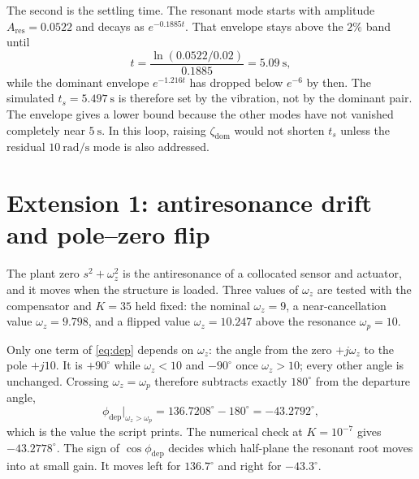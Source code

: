 \documentclass[12pt,a4paper]{article}
\begin{document}
The second is the settling time.
The resonant mode starts with amplitude \(A_{\mathrm{res}}=0.0522\) and decays as \(e^{-0.1885t}\).
That envelope stays above the \(2\%\) band until
\begin{equation}
  t=\frac{\ln(0.0522/0.02)}{0.1885}=5.09~\mathrm{s},
  \label{eq:tsenv}
\end{equation}
while the dominant envelope \(e^{-1.216t}\) has dropped below \(e^{-6}\) by then.
The simulated \(t_s=5.497~\mathrm{s}\) is therefore set by the vibration, not by the dominant pair. The envelope gives a lower bound because the other modes have not vanished completely near \(5~\mathrm{s}\).
In this loop, raising \(\zeta_{\mathrm{dom}}\) would not shorten \(t_s\) unless the residual \(10~\mathrm{rad/s}\) mode is also addressed.

\section{Extension 1: antiresonance drift and pole--zero flip}

The plant zero \(s^2+\omega_z^2\) is the antiresonance of a collocated sensor and actuator, and it moves when the structure is loaded.
Three values of \(\omega_z\) are tested with the compensator and \(K=35\) held fixed: the nominal \(\omega_z=9\), a near-cancellation value \(\omega_z=9.798\), and a flipped value \(\omega_z=10.247\) above the resonance \(\omega_p=10\).

Only one term of \eqref{eq:dep} depends on \(\omega_z\): the angle from the zero \(+j\omega_z\) to the pole \(+j10\).
It is \(+90^\circ\) while \(\omega_z<10\) and \(-90^\circ\) once \(\omega_z>10\); every other angle is unchanged.
Crossing \(\omega_z=\omega_p\) therefore subtracts exactly \(180^\circ\) from the departure angle,
\begin{equation}
  \phi_{\mathrm{dep}}\big|_{\omega_z>\omega_p}=136.7208^\circ-180^\circ=-43.2792^\circ ,
  \label{eq:flip}
\end{equation}
which is the value the script prints. The numerical check at \(K=10^{-7}\) gives \(-43.2778^\circ\).
The sign of \(\cos\phi_{\mathrm{dep}}\) decides which half-plane the resonant root moves into at small gain. It moves left for \(136.7^\circ\) and right for \(-43.3^\circ\).
\end{document}

